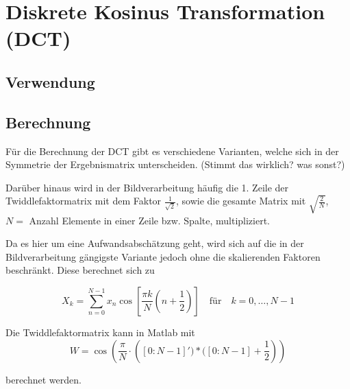 \section{Diskrete Kosinus Transformation (DCT)}
\subsection{Verwendung}


\subsection{Berechnung}
Für die Berechnung der DCT gibt es verschiedene Varianten, welche sich in der Symmetrie der Ergebnismatrix unterscheiden. (Stimmt das wirklich? was sonst?)

Darüber hinaus wird in der Bildverarbeitung häufig die 1. Zeile der Twiddlefaktormatrix mit dem Faktor $\frac{1}{\sqrt2}$, sowie die gesamte Matrix mit 
$\sqrt{\frac{2}{N}}$, $N =$ Anzahl Elemente in einer Zeile bzw. Spalte, multipliziert.

Da es hier um eine Aufwandsabschätzung geht, wird sich auf die in der Bildverarbeitung gängigste Variante jedoch ohne die skalierenden Faktoren beschränkt.
Diese berechnet sich zu

\begin{equation}
X_k = \sum_{n=0}^{N-1} x_n \cos\left[\frac{\pi k}{N} \left(n+\frac{1}{2}\right) \right] \quad \textrm{für} \quad  k=0,\dots,N-1
\end{equation}

Die Twiddlefaktormatrix kann in Matlab mit
 \begin{equation}\label{eq:matlab_dct_faktoren}
  W = \cos\left(\frac{\pi}{N}\cdot \left([0:N-1]')*([0:N-1]+\frac{1}{2}\right)\right)
 \end{equation}

berechnet werden.